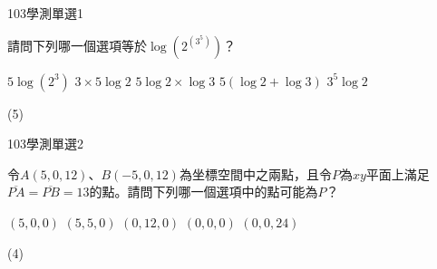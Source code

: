     \begin{QUESTION}
        \begin{ExamInfo}{103}{學測}{單選}{1}
        \end{ExamInfo}
        \begin{ExamAnsRateInfo}{82}{99}{93}{54}
        \end{ExamAnsRateInfo}
        \begin{QBODY}
            請問下列哪一個選項等於$\log \left( {{2}^{\left( {{3}^{5}} \right)}} \right)$？
			\begin{QOPS}
				\QOP $5\log \left( {{2}^{3}} \right)$
				\QOP $3\times 5\log 2$
				\QOP $5\log 2\times \log 3$
				\QOP $5\left( \log 2+\log 3 \right)$
				\QOP ${{3}^{5}}\log 2$
			\end{QOPS}
        \end{QBODY}
        \begin{QFROMS}
        \end{QFROMS}
        \begin{QTAGS}\end{QTAGS}
        \begin{QANS}
            (5)
        \end{QANS}
        \begin{QSOLLIST}
        \end{QSOLLIST}
        \begin{QEMPTYSPACE}
        \end{QEMPTYSPACE}
    \end{QUESTION}
    \begin{QUESTION}
        \begin{ExamInfo}{103}{學測}{單選}{2}
        \end{ExamInfo}
        \begin{ExamAnsRateInfo}{74}{95}{85}{42}
        \end{ExamAnsRateInfo}
        \begin{QBODY}
            令$A(5,0,12)$、$B(-5,0,12)$為坐標空間中之兩點，且令$P$為$xy$平面上滿足$\overline{PA}=\overline{PB}=13$的點。請問下列哪一個選項中的點可能為$P$？
			\begin{QOPS}
				\QOP $(5,0,0)$
				\QOP $(5,5,0)$
				\QOP $(0,12,0)$
				\QOP $(0,0,0)$
				\QOP $(0,0,24)$
			\end{QOPS}
        \end{QBODY}
        \begin{QFROMS}
        \end{QFROMS}
        \begin{QTAGS}\end{QTAGS}
        \begin{QANS}
            (4)
        \end{QANS}
        \begin{QSOLLIST}
        \end{QSOLLIST}
        \begin{QEMPTYSPACE}
        \end{QEMPTYSPACE}
    \end{QUESTION}
